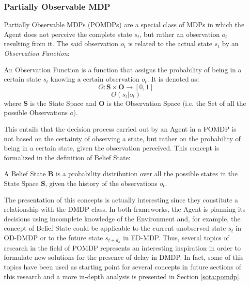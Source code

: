             \subsubsection{Partially Observable MDP}
                \label{subs:pomdp}
                Partially Observable MDPs (POMDPs) are a special class of MDPs in which the Agent does not perceive the complete state $s_t$, but rather an observation $o_t$ resulting from it. The said observation $o_t$ is related to the actual state $s_t$ by an \textit{Observation Function}:
                
                \begin{definition}
                    \label{def:pomdp-obsf}
                    An Observation Function is a function that assigns the probability of being in a certain state $s_t$ knowing a certain observation $o_t$. It is denoted as:
                    \[ O : \mathbf{S} \times \mathbf{O} \rightarrow [0, 1] \]
                    \[ O(s_t | o_t) \]
                    where $\mathbf{S}$ is the State Space and $\mathbf{O}$ is the Observation Space (i.e. the Set of all the possible Observations $o$). 
                \end{definition}
                \noindent
                This entails that the decision process carried out by an Agent in a POMDP is not based on the certainty of observing a state, but rather on the probability of being in a certain state, given the observation perceived. This concept is formalized in the definition of Belief State:
                
                \begin{definition}
                    \label{def:pomdp-belief}
                    A Belief State $\mathbf{B}$ is a probability distribution over all the possible states in the State Space $\mathbf{S}$, given the history of the observations $o_t$.
                \end{definition}
                \noindent
                The presentation of this concepts is actually interesting since they constitute a relationship with the DMDP class. In both frameworks, the Agent is planning its decisions using incomplete knowledge of the Environment and, for example, the concept of Belief State could be applicable to the current unobserved state $s_t$ in OD-DMDP or to the future state $s_{t+d_{a}}$ in ED-MDP. \newline
                Thus, several topics of research in the field of POMDP represents an interesting inspiration in order to formulate new solutions for the presence of delay in DMDP. In fact, some of this topics have been used as starting point for several concepts in future sections of this research and a more in-depth analysis is presented in Section \ref{sota:pomdp}.
            
